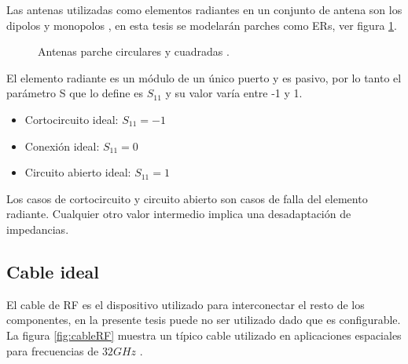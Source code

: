 Las antenas utilizadas como elementos radiantes en un conjunto de antena son los dipolos y monopolos \cite{Balanis2012}, en esta
tesis se modelarán parches como ERs, ver figura \ref{fig:radiatingElement}.
\begin{figure}[H]
	\centering
		\caption{Antenas parche circulares y cuadradas \cite{Balanis2012}.}
	\label{fig:radiatingElement}
\end{figure}

El elemento radiante es un módulo de un único puerto y es pasivo, por lo tanto el parámetro S que lo define es $S_{11}$ y su
valor varía entre -1 y 1.

\begin{itemize}
	\item Cortocircuito ideal: $S_{11} = -1$
	\item Conexión ideal: $S_{11} = 0$
	\item Circuito abierto ideal: $S_{11} = 1$
\end{itemize}

Los casos de cortocircuito y circuito abierto son casos de falla del elemento radiante. Cualquier otro valor intermedio implica
una desadaptación de impedancias.

\subsection{Cable ideal}
El cable de RF es el dispositivo utilizado para interconectar el resto de los componentes, en la presente tesis puede no ser 
utilizado dado que es configurable. La figura \ref{fig:cableRF} muestra un típico cable utilizado en aplicaciones espaciales 
para frecuencias de $32GHz$ \cite{Gore2013}.

